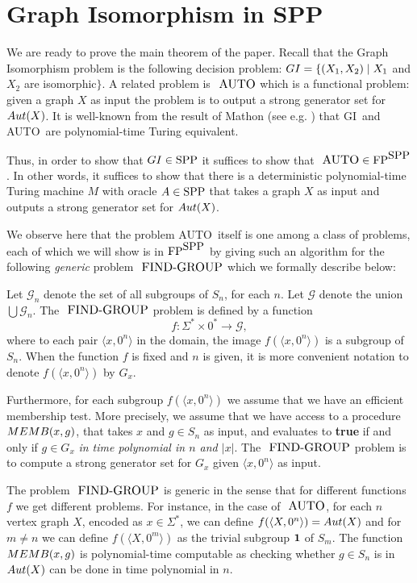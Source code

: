 \documentclass{elsart}
\newcommand{\FP}{\mbox{\rm FP}}
\newcommand{\SPP}{\mbox{\rm SPP}}
\newcommand{\AUTO}{\mbox{\small\rm AUTO}}
\newcommand{\FINDGROUP}{\mbox{\small\rm FIND{-}GROUP}}
\newcommand{\GI}{{\rm{GI}}}
\newcommand{\MEMB}{{\rm{MEMB}}}
\newcommand {\Aut}[1]{{\rm Aut}({#1})}
\renewcommand{\angle}[1]{\langle #1\rangle}
\begin{document}
\section{Graph Isomorphism in SPP}\label{mainsec}

We are ready to prove the main theorem of the paper. Recall that the
Graph Isomorphism problem is the following decision problem:
$\GI=\{(X_1,X_2)\mid X_1$ and $X_2$ are isomorphic$\}$. A related
problem is $\AUTO$ which is a functional problem: given a graph $X$ as
input the problem is to output a strong generator set for $\Aut X$.
It is well-known from the result of Mathon \cite{mathon79anote} (see
e.g.  \cite{gi-book}) that \GI\ and \AUTO\ are polynomial-time Turing
equivalent.

Thus, in order to show that $\GI\in\SPP$ it suffices to show that
$\AUTO\in\FP^{\SPP}$. In other words, it suffices to show that there
is a deterministic polynomial-time Turing machine $M$ with oracle
$A\in\SPP$ that takes a graph $X$ as input and outputs a strong
generator set for $\Aut X$.

We observe here that the problem \AUTO\ itself is one among a class of
problems, each of which we will show is in $\FP^{\SPP}$ by giving such
an algorithm for the following {\em generic} problem $\FINDGROUP$
which we formally describe below:

Let ${\mathcal G}_n$ denote the set of all subgroups of $S_n$, for each
$n$. Let ${\mathcal G}$ denote the union $\bigcup {\mathcal G}_n$. The 
$\FINDGROUP$ problem is defined by a function
\[
f:\Sigma^*\times 0^*\longrightarrow {\mathcal G},
\]
where to each pair $\angle{x,0^n}$ in the domain, the image
$f(\angle{x,0^n})$ is a subgroup of $S_n$. When the function $f$ is
fixed and $n$ is given, it is more convenient notation to denote
$f(\angle{x,0^n})$ by $G_x$.

Furthermore, for each subgroup $f(\angle{x,0^n})$ we assume that we
have an efficient membership test. More precisely, we assume that we
have access to a procedure $\MEMB(x,g)$, that takes $x$ and $g\in S_n$
as input, and evaluates to {\bf true} if and only if $g\in G_x$
\emph{in time polynomial in $n$ and $|x|$}. The $\FINDGROUP$ problem
is to compute a strong generator set for $G_x$ given $\angle{x,0^n}$
as input.

The problem $\FINDGROUP$ is generic in the sense that for different
functions $f$ we get different problems. For instance, in the case of
$\AUTO$, for each $n$ vertex graph $X$, encoded as $x\in\Sigma^*$, we
can define $f(\angle{X,0^n})=\Aut X$ and for $m\neq n$ we can define
$f(\angle{X,0^m})$ as the trivial subgroup ${\bf 1}$ of $S_m$.  The
function $\MEMB(x,g)$ is polynomial-time computable as checking
whether $g\in S_n$ is in $\Aut X$ can be done in time polynomial in
$n$.
\end{document}
